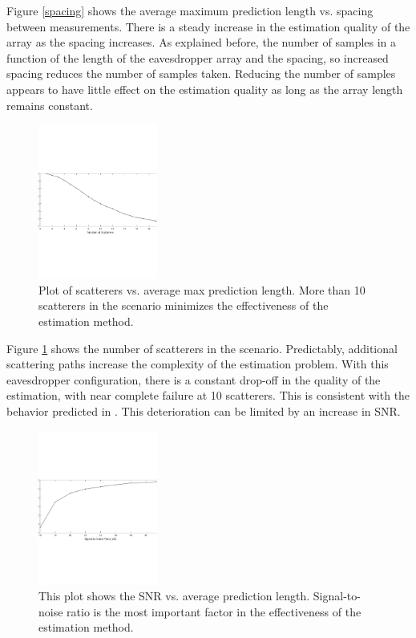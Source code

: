 \documentclass{allertonproc}
\begin{document}
Figure \ref{spacing} shows the average maximum prediction length vs. spacing between measurements. There is a steady increase in the estimation quality of the array as the spacing increases. As explained before, the number of samples in a function of the length of the eavesdropper array and the spacing, so increased spacing reduces the number of samples taken. Reducing the number of samples appears to have little effect on the estimation quality as long as the array length remains constant.
\begin{figure}[ht!]
\begin{center}
\includegraphics[height=2in]{numScatterers}
\caption{Plot of scatterers vs. average max prediction length. More than 10 scatterers in the scenario minimizes the effectiveness of the estimation method.}\label{Scatter}
\end{center}
\end{figure}

Figure \ref{Scatter} shows the number of scatterers in the scenario. Predictably, additional scattering paths increase the complexity of the estimation problem. With this eavesdropper configuration, there is a constant drop-off in the quality of the estimation, with near complete failure at 10 scatterers. This is consistent with the behavior predicted in \cite{kckpVTC2015}. This deterioration can be limited by an increase in SNR. 

\begin{figure}[ht!]
\begin{center}
\includegraphics[height=2in]{signalToNoise}
\caption{This plot shows the SNR vs. average prediction length. Signal-to-noise ratio is the most important factor in the effectiveness of the estimation method.}\label{SNR}
\end{center}
\end{figure}
\end{document}
